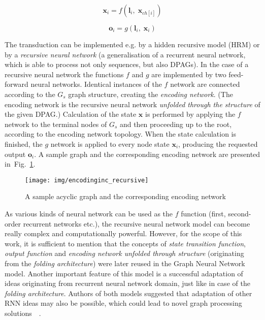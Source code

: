 \begin{equation}
\bm{x}_i = f(\bm{l}_i, \; \bm{x}_{ch[i]})
\label{eq:recursive_state}
\end{equation}

\begin{equation}
	\bm{o}_i = g(\bm{l}_i, \; \bm{x}_i)
\label{eq:recursive_output}
\end{equation}

The transduction can be implemented e.g. by a hidden recursive model (HRM) or by a \emph{recursive neural network} (a generalisation of a recurrent neural network, which is able to process not only sequences, but also DPAGs). In the case of a recursive neural network the functions $f$ and $g$ are implemented by two feed-forward neural networks. Identical instances of the $f$ network are connected according to the $G_s$ graph structure, creating the \emph{encoding network}. (The encoding network is the recursive neural network \emph{unfolded through the structure} of the given DPAG.) Calculation of the state $\bm{x}$ is performed by applying the $f$ network to the terminal nodes of $G_s$ and then proceeding up to the root, according to the encoding network topology. When the state calculation is finished, the $g$ network is applied to every node state $\bm{x}_i$, producing the requested output $\bm{o}_i$. A sample graph and the corresponding encoding network are presented in~Fig.~\ref{fig:recursive}.

\begin{figure}
\begin{center}
	\texttt{[image: img/encodinginc\_recursive]}
	\caption{A sample acyclic graph and the corresponding encoding network}
	\label{fig:recursive}
\end{center}
\end{figure}

As various kinds of neural network can be used as the $f$ function (first, second-order recurrent networks etc.), the recursive neural network model can become really complex and computationally powerful. However, for the scope of this work, it is sufficient to mention that the concepts of \emph{state transition function}, \emph{output function} and \emph{encoding network unfolded through structure} (originating from the \emph{folding architecture}) were later reused in the Graph Neural Network model. Another important feature of this model is a successful adaptation of ideas originating from recurrent neural network domain, just like in case of the \emph{folding architecture}. Authors of both models suggested that adaptation of other RNN ideas may also be possible, which could lead to novel graph processing solutions~\cite{kuchler1996inductive}~\cite{frasconi1998general}.

